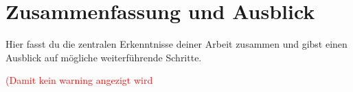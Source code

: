 
\section{Zusammenfassung und Ausblick}
\label{chap:zusammenfassung_ausblick}

Hier fasst du die zentralen Erkenntnisse deiner Arbeit zusammen und gibst einen Ausblick auf mögliche weiterführende Schritte.


\textcolor{red}{(Damit kein warning angezigt wird}